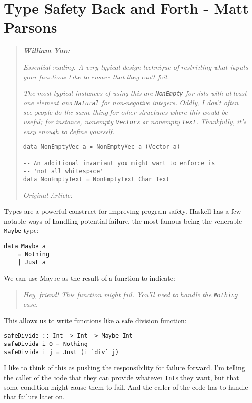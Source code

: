 \chapter{Type Safety Back and Forth - Matt Parsons}
\label{sec:type_safety_back_and_forth}

\begin{quotation}
\noindent\textit{\textbf{William Yao:}}

\textit{Essential reading. A very typical design technique of restricting what inputs your functions take to ensure that they can't fail.}

\textit{The most typical instances of using this are \texttt{NonEmpty} for lists with at least one element and \texttt{Natural} for non-negative integers. Oddly, I don't often see people do the same thing for other structures where this would be useful; for instance, nonempty \texttt{Vector}s or nonempty \texttt{Text}. Thankfully, it's easy enough to define yourself.}
\begin{verbatim}
data NonEmptyVec a = NonEmptyVec a (Vector a)

-- An additional invariant you might want to enforce is
-- 'not all whitespace'
data NonEmptyText = NonEmptyText Char Text
\end{verbatim}
\textit{Original Article: \cite{type_safety_back_and_forth}}
\end{quotation}


\noindent Types are a powerful construct for improving program safety. Haskell has a few notable ways of handling potential failure, the most famous being the venerable \texttt{Maybe} type:

\begin{verbatim}
data Maybe a
    = Nothing
    | Just a
\end{verbatim}
We can use Maybe as the result of a function to indicate:
\begin{quotation}
\noindent \textit{Hey, friend! This function might fail. You'll need to handle the \texttt{Nothing} case.                                                                             } 
\end{quotation} 
This allows us to write functions like a safe division function:

\begin{verbatim}
safeDivide :: Int -> Int -> Maybe Int
safeDivide i 0 = Nothing
safeDivide i j = Just (i `div` j)
\end{verbatim}

I like to think of this as pushing the responsibility for failure forward. I'm telling the caller of the code that they can provide whatever \texttt{Int}s they want, but that some condition might cause them to fail. And the caller of the code has to handle that failure later on.

